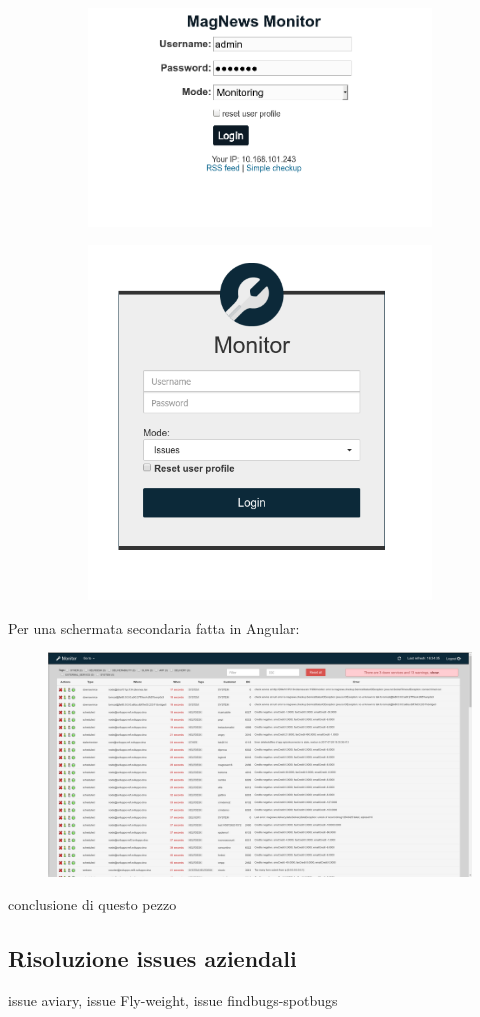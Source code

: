 \documentclass[a4paper]{article}
\begin{document}
\begin{figure}[H]
	\centering
	\begin{subfigure}
	  \centering
	  \includegraphics[width=0.45\linewidth]{login_old.png}
	\end{subfigure}%
	\begin{subfigure}
	  \centering
	  \includegraphics[width=0.45\linewidth]{login_new.png}
	\end{subfigure}
\end{figure}
Per una schermata secondaria fatta in Angular:
\begin{figure}[H]
	\includegraphics[width=\textwidth]{issue_new.png}
	\centering
\end{figure}
conclusione di questo pezzo
\subsection{Risoluzione issues aziendali}
issue aviary, issue Fly-weight, issue findbugs-spotbugs
\end{document}
